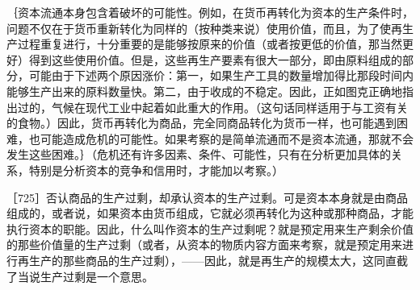 ｛资本流通本身包含着破坏的可能性。例如，在货币再转化为资本的生产条件时，问题不仅在于货币重新转化为同样的（按种类来说）使用价值，而且，为了使再生产过程重复进行，十分重要的是能够按原来的价值（或者按更低的价值，那当然更好）得到这些使用价值。但是，这些再生产要素有很大一部分，即由原料组成的部分，可能由于下述两个原因涨价：第一，如果生产工具的数量增加得比那段时间内能够生产出来的原料数量快。第二，由于收成的不稳定。因此，正如图克正确地指出过的，气候在现代工业中起着如此重大的作用。（这句话同样适用于与工资有关的食物。）因此，货币再转化为商品，完全同商品转化为货币一样，也可能遇到困难，也可能造成危机的可能性。如果考察的是简单流通而不是资本流通，那就不会发生这些困难。｝（危机还有许多因素、条件、可能性，只有在分析更加具体的关系，特别是分析资本的竞争和信用时，才能加以考察。）

［725］否认商品的生产过剩，却承认资本的生产过剩。可是资本本身就是由商品组成的，或者说，如果资本由货币组成，它就必须再转化为这种或那种商品，才能执行资本的职能。因此，什么叫作资本的生产过剩呢？就是预定用来生产剩余价值的那些价值量的生产过剩（或者，从资本的物质内容方面来考察，就是预定用来进行再生产的那些商品的生产过剩），——因此，就是再生产的规模太大，这同直截了当说生产过剩是一个意思。

